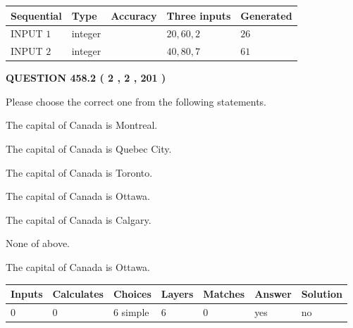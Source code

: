 \documentclass[12pt]{article}
\begin{document}
  
\noindent\begin{tabular}{|l|l|l|l|l|}
\hline
 Sequential & Type & Accuracy & Three inputs & Generated \\ 
\hline
 
 
  INPUT $  1 $ & integer &  & $
 20
 , 
 60
 , 
 2
 $ & $ 26 $ 
 \\  \hline  
 
 
  INPUT $  2 $ & integer &  & $
 40
 , 
 80
 , 
 7
 $ & $ 61 $ 
 \\  \hline  
 \end{tabular}
   
   
  
\vspace{0.2in}
  
{\textbf{\Large{QUESTION
458.2 
 ( 2 , 2 , 201 )
}}}
  
  
Please choose the correct one from the following statements.
 
 
The capital of Canada is Montreal.
 
 
The capital of Canada is Quebec City.
 
 
The capital of Canada is Toronto.
 
 
The capital of Canada is Ottawa.
 
 
The capital of Canada is Calgary.
 
 
 None of above.
 
 
\noindent{}
 
 
The capital of Canada is Ottawa.
 
 
\noindent{}
 
 
   
   
   
   
\noindent\begin{tabular}{|l|l|l|l|l|l|l|}
 \hline
Inputs & Calculates & Choices & Layers & Matches & Answer & Solution \\ \hline
 0  & 
 0  & 
 6
  simple  
  & 
 6  & 
 0  & 
  yes & 
  no 
  \\ \hline
 \end{tabular}
   
   
   
\end{document}
